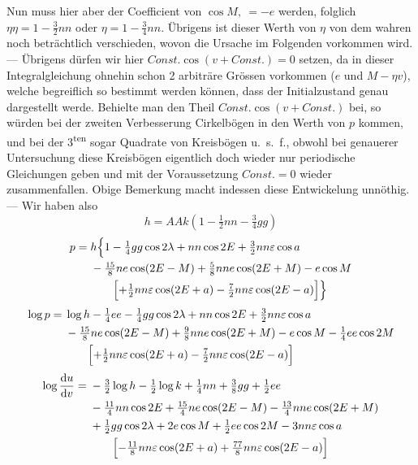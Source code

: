 \clearpage
\begingroup
{}
\renewcommand{\headrulewidth}{0pt}
\noindent Nun muss hier aber der Coefficient von \(\cos M,\ =-e\) werden,
folglich \(\eta\eta=1-\tfrac32nn\) oder \(\eta=1-\tfrac34nn\).
Übrigens ist dieser Werth von \(\eta\) von dem wahren noch beträchtlich
verschieden, wovon die Ursache im Folgenden vorkommen wird. --- Übrigens
dürfen wir hier \(\mathit{Const.}\cos(v+\mathit{Const.})=0\) setzen,
da in dieser Integralgleichung ohnehin schon 2 arbiträre Grössen vorkommen
(\(e\) und \(M-\eta v\)), welche begreiflich so bestimmt werden können,
dass der Initialzustand genau dargestellt werde. Behielte man den Theil
\(\mathit{Const.}\cos(v+\mathit{Const.})\) bei, so würden bei der zweiten
Verbesserung Cirkelbögen in den Werth von \(p\) kommen, und bei der
3\textsuperscript{ten} sogar Quadrate von Kreisbögen u.~s.~f., obwohl bei
genauerer Untersuchung diese Kreisbögen eigentlich doch wieder nur periodische
Gleichungen geben und mit der Voraussetzung \(\mathit{Const.}=0\) wieder
zusammenfallen. Obige Bemerkung macht indessen diese Entwickelung unnöthig. ---
Wir haben also
\[
 h=AAk(1-\tfrac12nn-\tfrac34gg)
\]
\[
\begin{aligned}
 p={}&h\Bigl\{1-\tfrac14gg\cos2\lambda+nn\cos2E+\tfrac32nn\varepsilon\cos a\\
 &-\tfrac{15}{8}ne\cos(2E-M)+\tfrac58nne\cos(2E+M)-e\cos M\\
 &\qquad\Bigl[+\tfrac12nn\varepsilon\cos(2E+a)
                  -\tfrac72nn\varepsilon\cos(2E-a)\Bigr]\Bigr\}
\end{aligned}
\]
\[
\begin{aligned}
 \log p={}&\log h-\tfrac14ee-\tfrac14gg\cos2\lambda+nn\cos2E
                  +\tfrac32nn\varepsilon\cos a\\
 &-\tfrac{15}{8}ne\cos(2E-M)+\tfrac98nne\cos(2E+M)
                  -e\cos M-\tfrac14ee\cos2M\\
 &\qquad\Bigl[+\tfrac12nn\varepsilon\cos(2E+a)
                  -\tfrac72nn\varepsilon\cos(2E-a)\Bigr]
\end{aligned}
\]
\[
\begin{aligned}
 \log\frac{\mathrm{d}u}{\mathrm{d}v}
   ={}&-\tfrac32\log h-\tfrac12\log k+\tfrac14nn+\tfrac38gg+\tfrac12ee\\
 &-\tfrac{11}{4}nn\cos2E+\tfrac{15}{4}ne\cos(2E-M)
                   -\tfrac{13}{4}nne\cos(2E+M)\\
 &+\tfrac12gg\cos2\lambda+2e\cos M+\tfrac12ee\cos2M-3nn\varepsilon\cos a\\
 &\qquad\Bigl[-\tfrac{11}{8}nn\varepsilon\cos(2E+a)
                   +\tfrac{77}{8}nn\varepsilon\cos(2E-a)\Bigr]
\end{aligned}
\]
